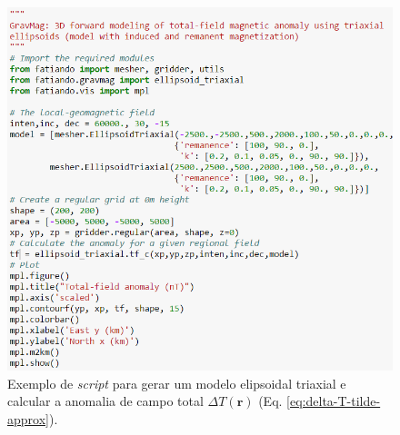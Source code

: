 \begin{figure}[hbt!]
	\centering \includegraphics[width=16 cm,height=17 cm]{figures/Cookbook_Triaxial}
	\caption[Exemplo de \textit{script} para gerar um modelo elipsoidal triaxial e calcular a anomalia de campo total $\Delta T (\mathbf{r})$ (Eq. \ref{eq:delta-T-tilde-approx}).]{Exemplo de \textit{script} para gerar um modelo elipsoidal triaxial e calcular a anomalia de campo total $\Delta T (\mathbf{r})$ (Eq. \ref{eq:delta-T-tilde-approx}).}
	\label{fig:Cookbook_Triaxial}
\end{figure}

